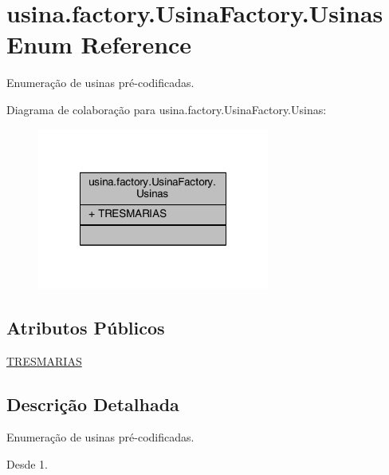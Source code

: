 \hypertarget{enumusina_1_1factory_1_1_usina_factory_1_1_usinas}{\section{usina.\-factory.\-Usina\-Factory.\-Usinas Enum Reference}
\label{enumusina_1_1factory_1_1_usina_factory_1_1_usinas}
}


Enumeração de usinas pré-\/codificadas.  




Diagrama de colaboração para usina.\-factory.\-Usina\-Factory.\-Usinas\-:\nopagebreak
\begin{figure}[H]
\begin{center}
\leavevmode
\includegraphics[width=216pt]{enumusina_1_1factory_1_1_usina_factory_1_1_usinas__coll__graph}
\end{center}
\end{figure}
\subsection*{Atributos Públicos}
\begin{DoxyCompactItemize}
\item 
\hyperlink{enumusina_1_1factory_1_1_usina_factory_1_1_usinas_a6e0e481f54f6ea96a004192167bf6560}{T\-R\-E\-S\-M\-A\-R\-I\-A\-S}
\end{DoxyCompactItemize}


\subsection{Descrição Detalhada}
Enumeração de usinas pré-\/codificadas. 

\begin{DoxySince}{Desde}
1. 
\end{DoxySince}


